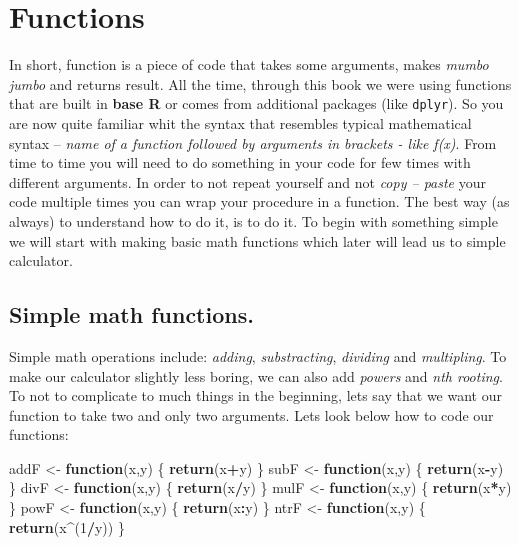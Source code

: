 \documentclass[]{book}
\newenvironment{Shaded}{\begin{snugshade}}{\end{snugshade}}
\newcommand{\KeywordTok}[1]{\textcolor[rgb]{0.13,0.29,0.53}{\textbf{#1}}}
\newcommand{\DecValTok}[1]{\textcolor[rgb]{0.00,0.00,0.81}{#1}}
\newcommand{\StringTok}[1]{\textcolor[rgb]{0.31,0.60,0.02}{#1}}
\newcommand{\ControlFlowTok}[1]{\textcolor[rgb]{0.13,0.29,0.53}{\textbf{#1}}}
\newcommand{\OperatorTok}[1]{\textcolor[rgb]{0.81,0.36,0.00}{\textbf{#1}}}
\newcommand{\NormalTok}[1]{#1}
\theoremstyle{definition}
\theoremstyle{definition}
\theoremstyle{definition}
\theoremstyle{remark}
\begin{document}
\chapter{Functions}\label{finalindications}

In short, function is a piece of code that takes some arguments, makes
\emph{mumbo jumbo} and returns result. All the time, through this book
we were using functions that are built in \textbf{base R} or comes from
additional packages (like \texttt{dplyr}). So you are now quite familiar
whit the syntax that resembles typical mathematical syntax -- \emph{name
of a function followed by arguments in brackets - like f(x)}. From time
to time you will need to do something in your code for few times with
different arguments. In order to not repeat yourself and not \emph{copy
-- paste} your code multiple times you can wrap your procedure in a
function. The best way (as always) to understand how to do it, is to do
it. To begin with something simple we will start with making basic math
functions which later will lead us to simple calculator.

\section{Simple math functions.}\label{simple-math-functions.}

Simple math operations include: \emph{adding}, \emph{substracting},
\emph{dividing} and \emph{multipling}. To make our calculator slightly
less boring, we can also add \emph{powers} and \emph{nth rooting}. To
not to complicate to much things in the beginning, lets say that we want
our function to take two and only two arguments. Lets look below how to
code our functions:

\begin{Shaded}
\begin{Highlighting}[]
\NormalTok{addF <-}\StringTok{ }\ControlFlowTok{function}\NormalTok{(x,y) \{}
  \KeywordTok{return}\NormalTok{(x}\OperatorTok{+}\NormalTok{y)}
\NormalTok{\}}
\NormalTok{subF <-}\StringTok{ }\ControlFlowTok{function}\NormalTok{(x,y) \{}
  \KeywordTok{return}\NormalTok{(x}\OperatorTok{-}\NormalTok{y)}
\NormalTok{\}}
\NormalTok{divF <-}\StringTok{ }\ControlFlowTok{function}\NormalTok{(x,y) \{}
  \KeywordTok{return}\NormalTok{(x}\OperatorTok{/}\NormalTok{y)}
\NormalTok{\}}
\NormalTok{mulF <-}\StringTok{ }\ControlFlowTok{function}\NormalTok{(x,y) \{}
  \KeywordTok{return}\NormalTok{(x}\OperatorTok{*}\NormalTok{y)}
\NormalTok{\}}
\NormalTok{powF <-}\StringTok{ }\ControlFlowTok{function}\NormalTok{(x,y) \{}
  \KeywordTok{return}\NormalTok{(x}\OperatorTok{:}\NormalTok{y)}
\NormalTok{\}}
\NormalTok{ntrF <-}\StringTok{ }\ControlFlowTok{function}\NormalTok{(x,y) \{}
  \KeywordTok{return}\NormalTok{(x}\OperatorTok{^}\NormalTok{(}\DecValTok{1}\OperatorTok{/}\NormalTok{y))}
\NormalTok{\}}
\end{Highlighting}
\end{Shaded}
\end{document}
